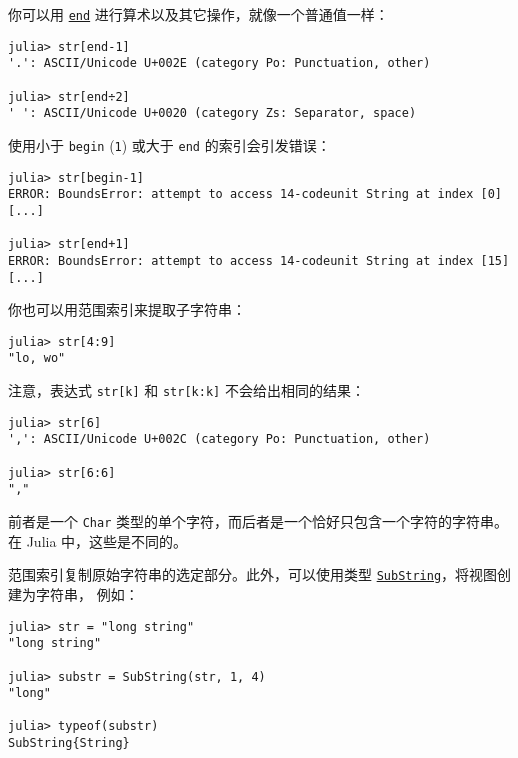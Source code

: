 你可以用 \hyperlink{11574363005673055470}{\texttt{end}} 进行算术以及其它操作，就像一个普通值一样：




\begin{verbatim}
julia> str[end-1]
'.': ASCII/Unicode U+002E (category Po: Punctuation, other)

julia> str[end÷2]
' ': ASCII/Unicode U+0020 (category Zs: Separator, space)
\end{verbatim}



使用小于 \texttt{begin} (\texttt{1}) 或大于 \texttt{end} 的索引会引发错误：




\begin{verbatim}
julia> str[begin-1]
ERROR: BoundsError: attempt to access 14-codeunit String at index [0]
[...]

julia> str[end+1]
ERROR: BoundsError: attempt to access 14-codeunit String at index [15]
[...]
\end{verbatim}



你也可以用范围索引来提取子字符串：




\begin{verbatim}
julia> str[4:9]
"lo, wo"
\end{verbatim}



注意，表达式 \texttt{str[k]} 和 \texttt{str[k:k]} 不会给出相同的结果：




\begin{verbatim}
julia> str[6]
',': ASCII/Unicode U+002C (category Po: Punctuation, other)

julia> str[6:6]
","
\end{verbatim}



前者是一个 \texttt{Char} 类型的单个字符，而后者是一个恰好只包含一个字符的字符串。在 Julia 中，这些是不同的。



范围索引复制原始字符串的选定部分。此外，可以使用类型 \hyperlink{2624824381693370630}{\texttt{SubString}}，将视图创建为字符串， 例如：




\begin{verbatim}
julia> str = "long string"
"long string"

julia> substr = SubString(str, 1, 4)
"long"

julia> typeof(substr)
SubString{String}
\end{verbatim}



